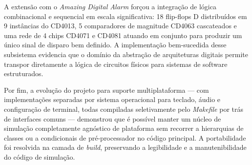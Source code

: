 \documentclass[12pt]{article}
\begin{document}
A extensão com o \textit{Amazing Digital Alarm} forçou a integração de lógica combinacional e sequencial em escala significativa: 18 flip-flops D distribuídos em 9 instâncias do CD4013, 5 comparadores de magnitude CD4063 cascateados e uma rede de 4 chips CD4071 e CD4081 atuando em conjunto para produzir um único sinal de disparo bem definido. A implementação bem-sucedida desse subsistema evidencia que o domínio da abstração de arquiteturas digitais permite transpor diretamente a lógica de circuitos físicos para sistemas de software estruturados.

Por fim, a evolução do projeto para suporte multiplataforma — com implementações separadas por sistema operacional para teclado, áudio e configuração de terminal, todas compiladas seletivamente pelo \textit{Makefile} por trás de interfaces comuns — demonstrou que é possível manter um núcleo de simulação completamente agnóstico de plataforma sem recorrer a hierarquias de classes ou a condicionais de pré-processador no código principal. A portabilidade foi resolvida na camada de \textit{build}, preservando a legibilidade e a manutenibilidade do código de simulação.
\end{document}
